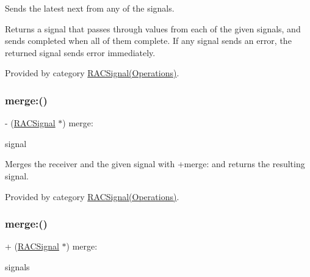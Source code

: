 Sends the latest {\ttfamily next} from any of the signals.

Returns a signal that passes through values from each of the given signals, and sends {\ttfamily completed} when all of them complete. If any signal sends an error, the returned signal sends {\ttfamily error} immediately. 

Provided by category \mbox{\hyperlink{category_r_a_c_signal_07_operations_08_a37d7e9c259ad5253a1f3ff644a86e52b}{R\+A\+C\+Signal(\+Operations)}}.

\mbox{\label{interface_r_a_c_signal_aeda66daaf146a2d218ba7819297628a9}} 
\subsubsection{\texorpdfstring{merge\+:()}{merge:()}\hspace{0.1cm}{\footnotesize\ttfamily [5/6]}}
{\footnotesize\ttfamily -\/ (\mbox{\hyperlink{interface_r_a_c_signal}{R\+A\+C\+Signal}} $\ast$) merge\+: \begin{DoxyParamCaption}\item[{(\mbox{\hyperlink{interface_r_a_c_signal}{R\+A\+C\+Signal}} $\ast$)}]{signal }\end{DoxyParamCaption}}

Merges the receiver and the given signal with {\ttfamily +merge\+:} and returns the resulting signal. 

Provided by category \mbox{\hyperlink{category_r_a_c_signal_07_operations_08_aeda66daaf146a2d218ba7819297628a9}{R\+A\+C\+Signal(\+Operations)}}.

\mbox{\label{interface_r_a_c_signal_a37d7e9c259ad5253a1f3ff644a86e52b}} 
\subsubsection{\texorpdfstring{merge\+:()}{merge:()}\hspace{0.1cm}{\footnotesize\ttfamily [6/6]}}
{\footnotesize\ttfamily + (\mbox{\hyperlink{interface_r_a_c_signal}{R\+A\+C\+Signal}} $\ast$) merge\+: \begin{DoxyParamCaption}\item[{(id$<$ N\+S\+Fast\+Enumeration $>$)}]{signals }\end{DoxyParamCaption}}

